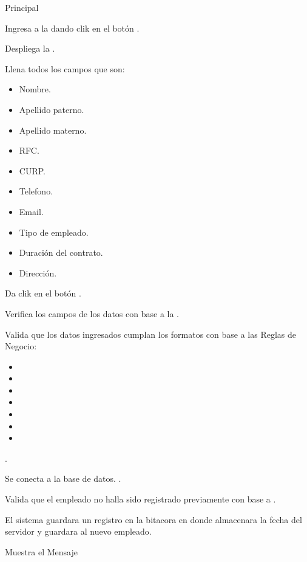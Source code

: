 	
	
	\begin{UCtrayectoria}{Principal}
	
		\UCpaso[\UCactor] Ingresa a la  dando clik en el botón . 
		
		\UCpaso Despliega la .

		\UCpaso[\UCactor] Llena todos los campos que son: 
			\begin{itemize}
				\item Nombre.
				\item Apellido paterno.
				\item Apellido materno.
				\item RFC.
				\item CURP.
				\item Telefono.
				\item Email.
				\item Tipo de empleado.
				\item Duración del contrato.
				\item Dirección.
			\end{itemize} 
		\label{CU16RegistrarEmpleado}

		\UCpaso[\UCactor] Da clik en el botón .\label{CU16ConectarBaseDatos}

		\UCpaso Verifica los campos de los datos con base a la  .

		\UCpaso Valida que los datos ingresados cumplan los formatos con base a las Reglas de Negocio: 
				
			\begin{itemize}
				\item	{} 
				\item	{} 
				\item	{} 
				\item	{} 
				\item	{} 
				\item	{} 
				\item	{} 
			\end{itemize} 
		.
		
		\UCpaso Se conecta a la base de datos. .

		\UCpaso Valida que el empleado no halla sido registrado previamente con base a  .

		\UCpaso El sistema guardara un registro en la bitacora en donde almacenara la fecha del servidor y guardara  al nuevo empleado.

		\UCpaso Muestra el Mensaje 
		

	\end{UCtrayectoria}



